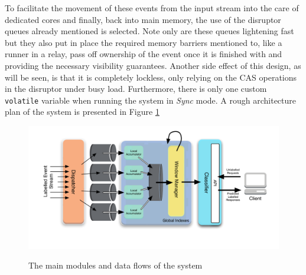 \documentclass[a4paper,11pt]{scrreprt}
\begin{document}
To facilitate the movement of these events from the input stream into the care of dedicated cores and finally, back into main memory, the use of the disruptor queues already mentioned is selected. Note only are these queues lightening fast but they also put in place the required memory barriers mentioned to, like a runner in a relay, pass off ownership of the event once it is finished with and providing the necessary visibility guarantees. Another side effect of this design, as will be seen, is that it is completely lockless, only relying on the CAS operations in the disruptor under busy load. Furthermore, there is only one custom \texttt{volatile} variable when running the system in \textit{Sync} mode. A rough architecture plan of the system is presented in Figure \ref{fig:architectureoverview}

\begin{figure}[h!]
\centering
\caption{The main modules and data flows of the system}
\includegraphics[scale=0.72, trim=35 50 0 13, clip=true] {architectureoverview.pdf}
\label{fig:architectureoverview}
\end{figure}
\end{document}
